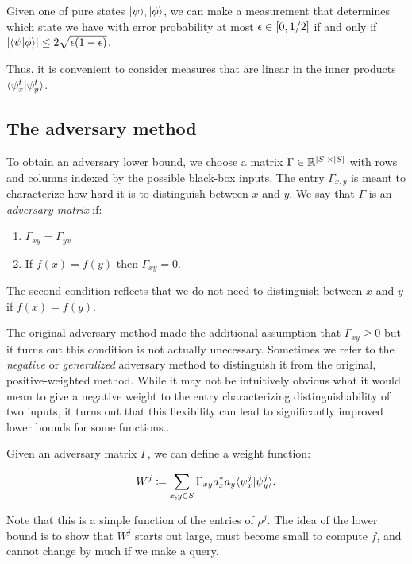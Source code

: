 \begin{factbox}{}
    Given one of pure states $\lvert \psi \rangle, \lvert \phi \rangle$, we can make a measurement that determines which state we have with error probability at most $\epsilon \in [0, 1/2]$ if and only if $\lvert \langle \psi \lvert \phi \rangle \rvert \leq 2\sqrt{\epsilon(1-\epsilon)}$.
\end{factbox}

Thus, it is convenient to consider measures that are linear in the inner products $\langle \psi_x^t \lvert \psi_y^t \rangle$. 

\subsection*{The adversary method}
To obtain an adversary lower bound, we choose a matrix $\Gamma \in \mathbb{R}^{\lvert S \rvert \times \lvert S \rvert}$ with rows and columns indexed by the possible black-box inputs. The entry $\Gamma_{x, y}$ is meant to characterize how hard it is to distinguish between $x$ and $y$. We say that $\Gamma$ is an \emph{adversary matrix} if:
\begin{enumerate}
    \item $\Gamma_{xy} = \Gamma_{yx}$
    \item If $f(x) = f(y)$ then $\Gamma_{xy} = 0$.
\end{enumerate}
The second condition reflects that we do not need to distinguish between $x$ and $y$ if $f(x) = f(y)$.

The original adversary method made the additional assumption that $\Gamma_{xy} \geq 0$ but it turns out this condition is not actually unecessary. Sometimes we refer to the \emph{negative} or \emph{generalized} adversary method to distinguish it from the original, positive-weighted method. While it may not be intuitively obvious what it would mean to give a negative weight to the entry characterizing distinguishability of two inputs, it turns out that this flexibility can lead to significantly improved lower bounds for some functions..

Given an adversary matrix $\Gamma$, we can define a weight function:

\begin{equation}
    W^j \coloneqq \sum_{x, y \in S}\Gamma_{xy}a^*_x a_y\langle \psi^j_x \lvert \psi^j_y \rangle.
\end{equation}

Note that this is a simple function of the entries of $\rho^j$. The idea of the lower bound is to show that $W^j$ starts out large, must become small to compute $f$, and cannot change by much if we make a query.

